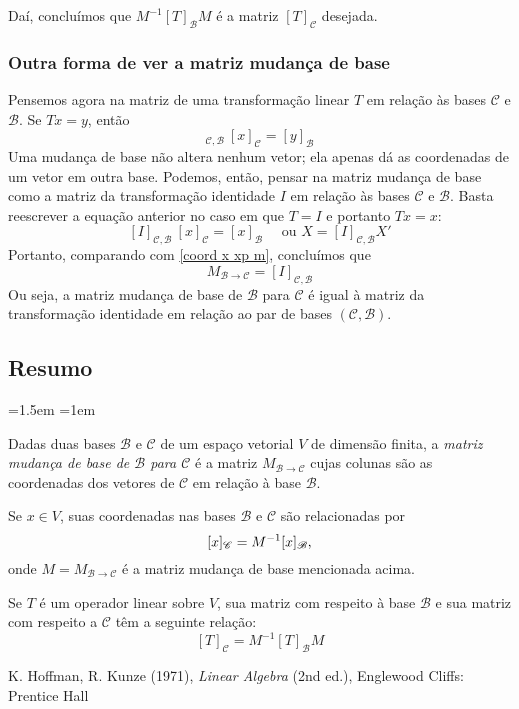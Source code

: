 \documentclass[a4paper,11pt]{article}
\newcommand{\V}{V}
\newcommand{\B}{\mathscr{B}}
\newcommand{\C}{\mathscr{C}}
\begin{document}
Daí, concluímos que $M^{-1} [T]_\B M$ é a matriz $[T]_\C$ desejada.


\subsubsection*{Outra forma de ver a matriz mudança de base}

Pensemos agora na matriz de uma transformação linear $T$ em relação às bases $\C$ e $\B$.  Se $Tx = y$, então
\begin{equation}
    [T]_{\C\!,\B}\ [x]_{\C} = [y]_{\B}
\end{equation}
Uma mudança de base não altera nenhum vetor; ela apenas dá as coordenadas de um vetor em outra base.  Podemos, então, pensar na matriz mudança de base como a matriz da transformação identidade $I$ em relação às bases $\C$ e $\B$.  Basta reescrever a equação anterior no caso em que $T = I$ e portanto $Tx = x$:
\[
    [I]_{\C\!,\B}\ [x]_{\C} = [x]_{\B}  \quad\text{ ou }
    X = [I]_{\C\!, \B} X'
\]
Portanto, comparando com \eqref{coord x xp m}, concluímos que
\[
    M_{\B \to \C} = [I]_{\C\!, \B}
\]
Ou seja, a matriz mudança de base de $\B$ para $\C$ é igual à matriz da transformação identidade em relação ao par de bases $(\C, \B)$.


\bigskip

\setlength{\fboxsep}{0.75em}
\noindent\colorbox[gray]{0.875}{\parbox{\linewidth-2\fboxsep}{
\vspace*{-1em}
\subsection*{Resumo}
\sffamily
\parindent=1.5em
\parskip=1em

Dadas duas bases $\B$ e $\C$ de um espaço vetorial $\V$ de dimensão finita, a \emph{matriz mudança de base de $\B$ para $\C$} é a matriz $M_{\B \to \C}$ cujas colunas são as coordenadas dos vetores de $\C$ em relação à base $\B$.

Se $x \in \V$, suas coordenadas nas bases $\B$ e $\C$ são relacionadas por
\[
    [x]_\C = M^{-1} [x]_\B  \text,
\]
onde $M = M_{\B \to \C}$ é a matriz mudança de base mencionada acima.

Se $T$ é um operador linear sobre $\V$, sua matriz com respeito à base $\B$ e sua matriz com respeito a $\C$ têm a seguinte relação:
\[
    [T]_\C = M^{-1} [T]_\B M
\]
}}

\begin{thebibliography}{1}
   K. Hoffman, R. Kunze (1971), \textit{Linear Algebra} (2nd ed.), Englewood Cliffs: Prentice Hall
  
\end{thebibliography}
\end{document}
